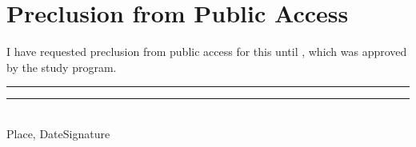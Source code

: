 \section*{\centering Preclusion from Public Access}\thispagestyle{plain}\label{preclusion}
I have requested preclusion from public access for this \MakeLowercase{\thesis} until \preclusiondate, which was approved by the study program.

\vspace{2.5cm}

\rule{5cm}{0.2pt}\hfill\rule{5cm}{0.2pt}\\
\footnotesize\phantom{}\hspace{17mm} Place, Date\hfill Signature\hspace{17mm}
\clearpage\normalsize
